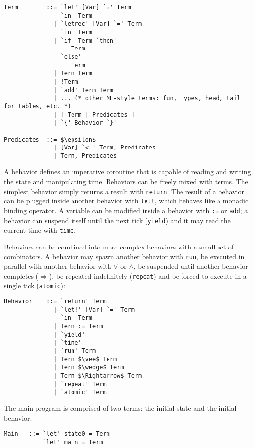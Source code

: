 \begin{lstlisting}
Term        ::= `let' [Var] `=' Term 
                `in' Term
              | `letrec' [Var] `=' Term 
                `in' Term
              | `if' Term `then' 
                   Term 
                `else' 
                   Term
              | Term Term
              | !Term
              | `add' Term Term
              | ... (* other ML-style terms: fun, types, head, tail for tables, etc. *)
              | [ Term | Predicates ]
              | `{' Behavior `}'
              
Predicates  ::= $\epsilon$
              | [Var] `<-' Term, Predicates
              | Term, Predicates
\end{lstlisting}

A behavior defines an imperative coroutine that is capable of reading and writing the state and manipulating time. Behaviors can be freely mixed with terms. The simplest behavior simply returns a result with \texttt{return}. The result of a behavior can be plugged inside another behavior with \texttt{let!}, which behaves like a monadic binding operator. A variable can be modified inside a behavior with \texttt{:=} or \texttt{add}; a behavior can suspend itself until the next tick (\texttt{yield}) and it may read the current time with \texttt{time}.

Behaviors can be combined into more complex behaviors with a small set of combinators. A behavior may spawn another behavior with \texttt{run}, be executed in parallel with another behavior with $\vee$ or $\wedge$, be suspended until another behavior completes ($\Rightarrow$), be repeated indefinitely (\texttt{repeat}) and be forced to execute in a single tick (\texttt{atomic}):

\begin{lstlisting}
Behavior    ::= `return' Term
              | `let!' [Var] `=' Term
                `in' Term
              | Term := Term
              | `yield'
              | `time'
              | `run' Term
              | Term $\vee$ Term
              | Term $\wedge$ Term
              | Term $\Rightarrow$ Term
              | `repeat' Term
              | `atomic' Term
\end{lstlisting}

The main program is comprised of two terms: the initial state and the initial behavior:

\begin{lstlisting}
Main   ::= `let' state0 = Term
           `let' main = Term
\end{lstlisting}


